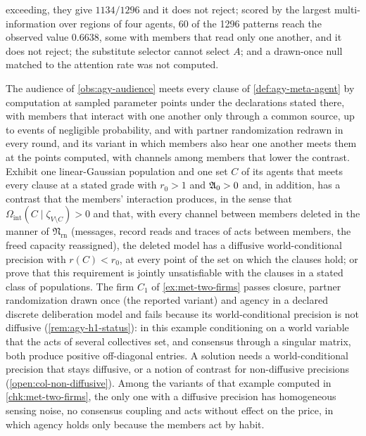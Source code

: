 exceeding, they give $1134/1296$ and it does not reject; scored by the largest multi-information over regions of four agents, 60 of the 1296 patterns reach the observed value $0.6638$, some with members that read only one another, and it does not reject; the substitute selector cannot select $A$; and a drawn-once null matched to the attention rate was not computed.

\begin{openproblem}\label{open:agy-meta-agent-exists}
The audience of \cref{obs:agy-audience} meets every clause of \cref{def:agy-meta-agent} by computation at sampled parameter points under the declarations stated there, with members that interact with one another only through a common source, up to events of negligible probability, and with partner randomization redrawn in every round, and its variant in which members also hear one another meets them at the points computed, with channels among members that lower the contrast. Exhibit one linear-Gaussian population and one set $C$ of its agents that meets every clause at a stated grade with $r_0>1$ and $\mathfrak{A}_0>0$ and, in addition, has a contrast that the members' interaction produces, in the sense that $\Omega_{\mathrm{int}}(C\mid\zeta_{V\setminus C})>0$ and that, with every channel between members deleted in the manner of $\mathfrak N_{\mathrm{rn}}$ (messages, record reads and traces of acts between members, the freed capacity reassigned), the deleted model has a diffusive world-conditional precision with $r(C)<r_0$, at every point of the set on which the clauses hold; or prove that this requirement is jointly unsatisfiable with the clauses in a stated class of populations. The firm $C_1$ of \cref{ex:met-two-firms} passes closure, partner randomization drawn once (the reported variant) and agency in a declared discrete deliberation model and fails because its world-conditional precision is not diffusive (\cref{rem:agy-h1-status}): in this example conditioning on a world variable that the acts of several collectives set, and consensus through a singular matrix, both produce positive off-diagonal entries. A solution needs a world-conditional precision that stays diffusive, or a notion of contrast for non-diffusive precisions (\cref{open:col-non-diffusive}). Among the variants of that example computed in \cref{chk:met-two-firms}, the only one with a diffusive precision has homogeneous sensing noise, no consensus coupling and acts without effect on the price, in which agency holds only because the members act by habit.
\end{openproblem}

